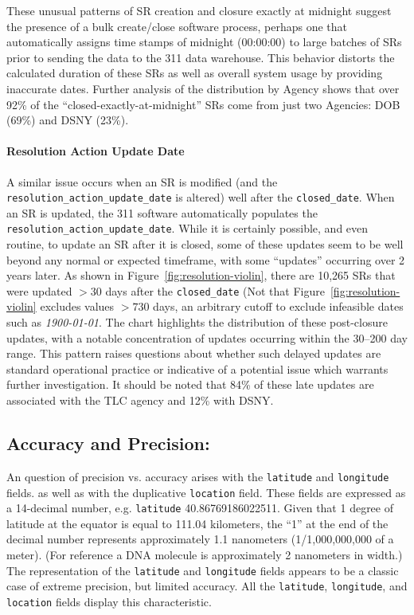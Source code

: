 \documentclass[linenumber]{jdsart}
\begin{document}
These unusual patterns of SR creation and closure exactly at midnight 
suggest the presence of a bulk create/close software process, perhaps one
that automatically assigns time stamps of midnight (00:00:00) to 
large batches of SRs prior to sending the data to the 311 
data warehouse. This behavior distorts the calculated duration of these 
SRs as well as overall system usage by providing inaccurate 
dates. Further analysis of the distribution by Agency shows that over 92\% of 
the ``closed-exactly-at-midnight'' SRs come from just two 
Agencies: DOB (69\%) and DSNY  (23\%).


\paragraph{Resolution Action Update Date}
A similar issue occurs when an SR is modified (and the \texttt{resolution\_action\_update\_date} is altered) well 
after the \texttt{closed\_date}.  When an SR is 
updated, the 311 software automatically populates the \texttt{resolution\_action\_update\_date}. While it is certainly 
possible, and even routine, to update an SR after it is closed, 
some of these updates seem to be well beyond any 
normal or expected timeframe, with some ``updates'' 
occurring over 2 years later. As shown in Figure~\ref{fig:resolution-violin}, 
there are 10,265 SRs that were updated $>30$ days after the 
\texttt{closed\_date} (Not that Figure~\ref{fig:resolution-violin} excludes 
values $>730$ days, an arbitrary cutoff to exclude 
infeasible dates such as \textit{1900-01-01}. The chart 
highlights the distribution of these post-closure 
 updates, with a notable concentration of updates occurring within 
the 30--200 day range. This pattern raises 
questions about whether such delayed updates are standard 
operational practice or indicative of a potential issue 
which warrants further investigation. It should be noted
that 84\% of these late updates are associated with the TLC agency
and 12\% with DSNY.


\subsection{Accuracy and Precision:}
\label{sec:precision}
An question of precision vs. accuracy arises with the \texttt{latitude} 
and \texttt{longitude} fields. as well as with the duplicative 
\texttt{location} field. These fields are expressed as
a 14-decimal number, e.g. \texttt{latitude} 40.86769186022511. 
Given that 1 degree of latitude at the equator is equal to 111.04 
kilometers, the ``1'' at the end of the decimal number represents 
approximately 1.1 nanometers (1/1,000,000,000 of a meter). (For 
reference a DNA molecule is approximately 2 nanometers in width.) The 
representation of the \texttt{latitude} and \texttt{longitude} fields
appears to be a classic case of extreme precision, but limited 
accuracy. All the \texttt{latitude}, \texttt{longitude}, and \texttt{location}
fields display this characteristic. 
\end{document}
